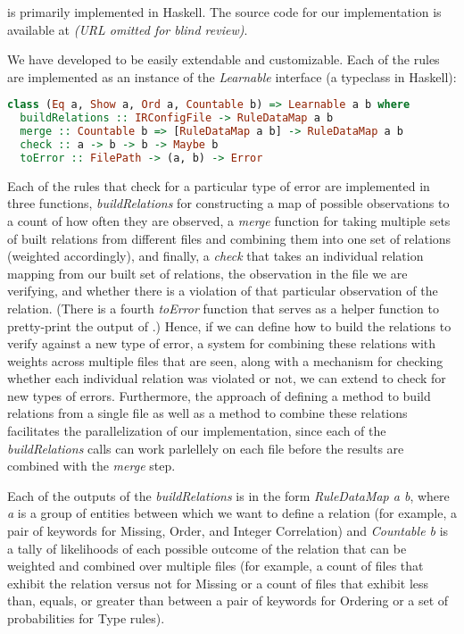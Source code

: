 \app is primarily implemented in Haskell.
The source code for our implementation is available at {\em (URL omitted for blind review)}.

We have developed \app to be easily extendable and customizable. Each of the rules are implemented as an instance of the \textit{Learnable} interface (a typeclass in Haskell):

\begin{lstlisting}[language=Haskell, xleftmargin=.01\textwidth]
class (Eq a, Show a, Ord a, Countable b) => Learnable a b where
  buildRelations :: IRConfigFile -> RuleDataMap a b
  merge :: Countable b => [RuleDataMap a b] -> RuleDataMap a b
  check :: a -> b -> b -> Maybe b
  toError :: FilePath -> (a, b) -> Error
\end{lstlisting} 

Each of the rules that check for a particular type of error are implemented in three functions, \textit{buildRelations} for constructing a map of possible observations to a count of how often they are observed, a \textit{merge} function for taking multiple sets of built relations from different files and combining them into one set of relations (weighted accordingly), and finally, a \textit{check} that takes an individual relation mapping from our built set of relations, the observation in the file we are verifying, and whether there is a violation of that particular observation of the relation. (There is a fourth \textit{toError} function that serves as a helper function to pretty-print the output of \app.) Hence, if we can define how to build the relations to verify against a new type of error, a system for combining these relations with weights across multiple files that are seen, along with a mechanism for checking whether each individual relation was violated or not, we can extend \app to check for new types of errors. Furthermore, the approach of defining a method to build relations from a single file as well as a method to combine these relations facilitates the parallelization of our implementation, since each of the \textit{buildRelations} calls can work parlellely on each file before the results are combined with the \textit{merge} step.

Each of the outputs of the \textit{buildRelations} is in the form \textit{RuleDataMap a b}, where \textit{a} is a group of entities between which we want to define a relation (for example, a pair of keywords for Missing, Order, and Integer Correlation) and \textit{Countable b} is a tally of likelihoods of each possible outcome of the relation that can be weighted and combined over multiple files (for example, a count of files that exhibit the relation versus not for Missing or a count of files that exhibit less than, equals, or greater than between a pair of keywords for Ordering or a set of probabilities for Type rules).


